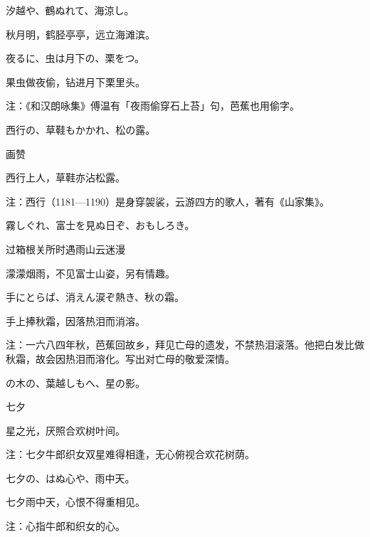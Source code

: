 \begin{haiku}
    {\FH 汐越や、鶴ぬれて、海涼し。}

    {\FK 秋月明，鹤胫亭亭，远立海滩滨。}
\end{haiku}

\begin{haiku}
    {\FH 夜るに、虫は月下の、栗をつ。}

    {\FK 果虫做夜偷，钻进月下栗里头。}

    {\FT 注：《和汉朗咏集》傅温有「夜雨偷穿石上苔」句，芭蕉也用偷字。}
\end{haiku}

\begin{haiku}
    {\FH 西行の、草鞋もかかれ、松の露。}

    {\FK 画赞}

    {\FK 西行上人，草鞋亦沾松露。}

    {\FT 注：西行（1181—1190）是身穿袈裟，云游四方的歌人，著有《山家集》。}
\end{haiku}

\begin{haiku}
    {\FH 霧しぐれ、富士を見ぬ日ぞ、おもしろき。}

    {\FK 过箱根关所时遇雨山云迷漫}

    {\FK 濛濛烟雨，不见富士山姿，另有情趣。}
\end{haiku}

\begin{haiku}
    {\FH 手にとらば、消えん涙ぞ熱き、秋の霜。}

    {\FK 手上捧秋霜，因落热泪而消溶。}

    {\FT 注：一六八四年秋，芭蕉回故乡，拜见亡母的遗发，不禁热泪滚落。他把白发比做秋霜，故会因热泪而溶化。写出对亡母的敬爱深情。}
\end{haiku}

\begin{haiku}
    {\FH {}の木の、葉越しもへ、星の影。}

    {\FK 七夕}

    {\FK 星之光，厌照合欢树叶间。}

    {\FT 注：七夕牛郎织女双星难得相逢，无心俯视合欢花树荫。}
\end{haiku}

\begin{haiku}
    {\FH 七夕の、はぬ心や、雨中天。}

    {\FK 七夕雨中天，心恨不得重相见。}

    {\FT 注：心指牛郎和织女的心。}
\end{haiku}


